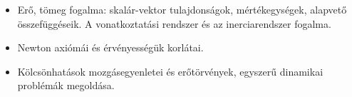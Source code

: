 \documentclass[../fizika.tex]{subfiles}
\begin{document}
    \begin{itemize}
        \item Erő, tömeg fogalma: skalár-vektor tulajdonságok, mértékegységek, alapvető összefüggéseik. A vonatkoztatási rendszer és az inerciarendszer fogalma.
        \item Newton axiómái és érvényességük korlátai.
        \item Kölcsönhatások mozgásegyenletei és erőtörvények, egyszerű dinamikai problémák megoldása.
    \end{itemize}
\end{document}
